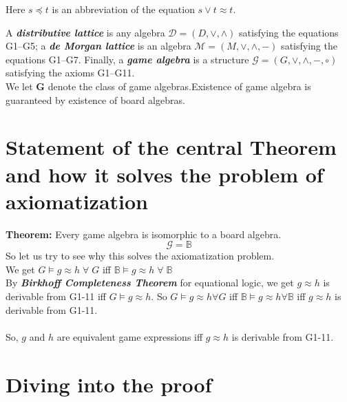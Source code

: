 \documentclass[12pt]{article}
\begin{document}
Here $s \preceq t$ is an abbreviation of the equation $s \lor t \approx t$.

\medskip

A \textbf{\emph{distributive lattice}} is any algebra 
$\mathcal{D} = (D, \lor, \land)$ satisfying the equations G1--G5;  
a \textbf{\emph{de Morgan lattice}} is an algebra 
$\mathcal{M} = (M, \lor, \land, -)$ satisfying the equations G1--G7.  
Finally, a \textbf{\emph{game algebra}} is a structure 
$\mathcal{G} = (G, \lor, \land, -, \circ)$ satisfying the axioms G1--G11. \\ 

We let $\mathbf{G}$ denote the class of game algebras.Existence of game algebra is guaranteed by existence of board algebras.
\section{Statement of the central Theorem and how it solves the problem of axiomatization}
\textbf{Theorem:} Every game algebra is isomorphic to a board algebra. 
\[
\mathcal{G}=\mathbb{B}\]
So let us try to see why this solves the axiomatization problem.\\ We get $G \vDash g \approx h  \; \forall \; G$ iff $\mathbb{B} \vDash g \approx h \; \forall \; \mathbb{B}$ \\
By \textbf{\emph{Birkhoff Completeness Theorem}} for equational logic, we get $g \approx h$ is derivable from G1-11 iff $G \vDash g \approx h$. So $G \vDash g \approx h \forall G$ iff $\mathbb{B} \vDash g \approx h \forall \mathbb{B}$ iff $g \approx h$ is derivable from G1-11.\\ \\
So, $g$ and $h$ are equivalent game expressions iff $g \approx h$ is derivable from G1-11. 
\section{Diving into the proof}
\end{document}
